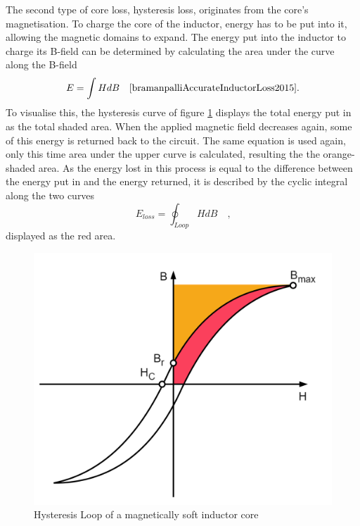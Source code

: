 The second type of core loss, hysteresis loss, originates from the core's magnetisation. To charge the core of the inductor, energy has to be put into it, allowing the magnetic domains to expand. The energy put into the inductor to charge its B-field can be determined by calculating the area under the curve along the B-field
\begin{equation}
        E = \int H dB \label{eq:hysteresis_energy} \quad\text{\cite{bramanpalliAccurateInductorLoss2015}.}
\end{equation}
To visualise this, the hysteresis curve of figure \ref{fig:b-hcurve} displays the total energy put in as the total shaded area.
When the applied magnetic field decreases again, some of this energy is returned back to the circuit. The same equation is used again, only this time area under the upper curve is calculated, resulting the the orange-shaded area. As the energy lost in this process is equal to the difference between the energy put in and the energy returned, it is described by the cyclic integral along the two curves
\begin{equation}
    E_{loss} = \oint_{Loop} H dB \quad\text{,}\label{eq:hysteresis_energy_cyclic}
\end{equation}
displayed as the red area.
\begin{figure}[H]
    \centering
    \includegraphics[width=0.6\linewidth]{Bilder//Kapitel2/Hysteresiscurve.png}
    \caption{Hysteresis Loop of a magnetically soft inductor core}
    \label{fig:b-hcurve}
\end{figure}

